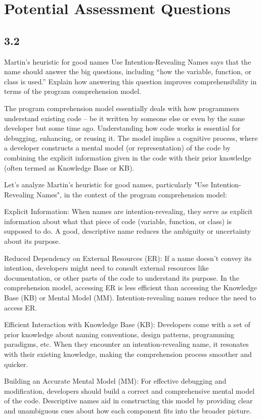 \section{Potential Assessment Questions}
\subsection{3.2}
Martin’s heuristic for good names Use Intention-Revealing Names says that the name should answer the big questions, including “how the variable, function, or class is used.”
Explain how answering this question improves comprehensibility in terms of the program comprehension model.

The program comprehension model essentially deals with how programmers understand existing code – be it written by someone else or even by the same developer but some time ago. Understanding how code works is essential for debugging, enhancing, or reusing it. The model implies a cognitive process, where a developer constructs a mental model (or representation) of the code by combining the explicit information given in the code with their prior knowledge (often termed as Knowledge Base or KB).

Let's analyze Martin's heuristic for good names, particularly "Use Intention-Revealing Names", in the context of the program comprehension model:

Explicit Information: When names are intention-revealing, they serve as explicit information about what that piece of code (variable, function, or class) is supposed to do. A good, descriptive name reduces the ambiguity or uncertainty about its purpose.

Reduced Dependency on External Resources (ER): If a name doesn't convey its intention, developers might need to consult external resources like documentation, or other parts of the code to understand its purpose. In the comprehension model, accessing ER is less efficient than accessing the Knowledge Base (KB) or Mental Model (MM). Intention-revealing names reduce the need to access ER.

Efficient Interaction with Knowledge Base (KB): Developers come with a set of prior knowledge about naming conventions, design patterns, programming paradigms, etc. When they encounter an intention-revealing name, it resonates with their existing knowledge, making the comprehension process smoother and quicker.

Building an Accurate Mental Model (MM): For effective debugging and modification, developers should build a correct and comprehensive mental model of the code. Descriptive names aid in constructing this model by providing clear and unambiguous cues about how each component fits into the broader picture.

